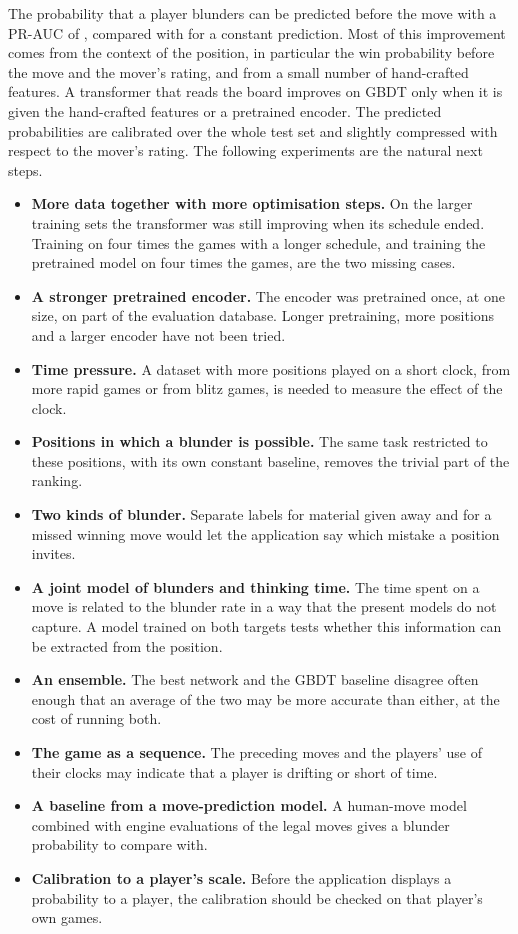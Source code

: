 \documentclass[11pt]{article}
\begin{document}
The probability that a player blunders can be predicted before the move with
a PR-AUC of , compared with  for a constant
prediction. Most of this improvement comes from the context of the position,
in particular the win probability before the move and the mover's rating,
and from a small number of hand-crafted features. A transformer that reads
the board improves on GBDT only when it is given the hand-crafted features
or a pretrained encoder. The predicted probabilities are calibrated over the
whole test set and slightly compressed with respect to the mover's rating.
The following experiments are the natural next steps.
\begin{itemize}
\ifmore
\item \textbf{More data together with more optimisation steps.} On the
larger training sets the transformer was still improving when its schedule
ended. Training on four times the games with a longer schedule, and training
the pretrained model on four times the games, are the two missing cases.
\fi
\ifchangestart
\item \textbf{A stronger pretrained encoder.} The encoder was pretrained
once, at one size, on part of the evaluation database. Longer pretraining,
more positions and a larger encoder have not been tried.
\fi
\item \textbf{Time pressure.} A dataset with more positions played on a
short clock, from more rapid games or from blitz games, is needed to measure
the effect of the clock.
\item \textbf{Positions in which a blunder is possible.} The same task
restricted to these positions, with its own constant baseline, removes the
trivial part of the ranking.
\item \textbf{Two kinds of blunder.} Separate labels for material given away
and for a missed winning move would let the application say which mistake a
position invites.
\item \textbf{A joint model of blunders and thinking time.} The time spent
on a move is related to the blunder rate in a way that the present models do
not capture. A model trained on both targets tests whether this information
can be extracted from the position.
\item \textbf{An ensemble.} The best network and the GBDT baseline disagree
often enough that an average of the two may be more accurate than either, at
the cost of running both.
\item \textbf{The game as a sequence.} The preceding moves and the players'
use of their clocks may indicate that a player is drifting or short of time.
\item \textbf{A baseline from a move-prediction model.} A human-move model
combined with engine evaluations of the legal moves gives a blunder
probability to compare with.
\item \textbf{Calibration to a player's scale.} Before the application
displays a probability to a player, the calibration should be checked on
that player's own games.
\end{itemize}
\end{document}
